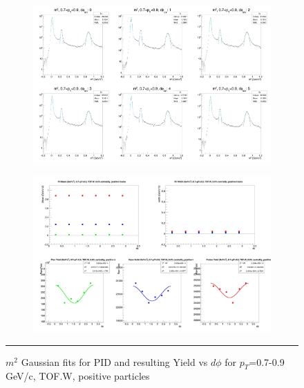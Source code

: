 \begin{figure}[H]
  \centering
    \begin{subfigure}[p]{1\textwidth}
    \includegraphics[width=1\textwidth]{lowptfits/yieldvsdphi_tof1_cent0_ch1_pT-7-9.jpg}
    \end{subfigure}
    \begin{subfigure}[p]{1\textwidth}
    \includegraphics[width=1\textwidth]{lowptfits/fitParams_tof1_cent0_ch1_pT-7-9.jpg}
    \end{subfigure}
    \rule{35em}{0.5pt}
  \caption[PID fits and Yield vs $d\phi$ for $p_T$=0.7-0.9 GeV/c, TOF.W, positive particles ]{$m^2$ Gaussian fits for PID and resulting Yield vs $d\phi$ for $p_T$=0.7-0.9 GeV/c, TOF.W, positive particles}
  \label{fig:fits7-9pos}
\end{figure}

